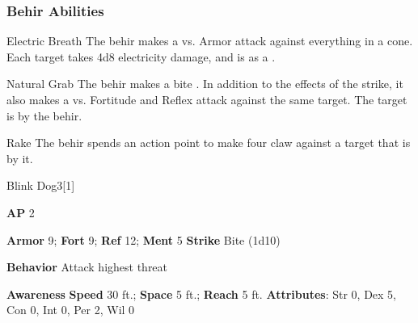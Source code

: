 \subsubsection{Behir Abilities}

\begin{ability}{Electric Breath}
The behir makes a  vs. Armor attack against everything in a \areamed cone.
\hit Each target takes 4d8 electricity damage, and is  as a .
\end{ability}

\vspace{0.5em}
\begin{ability}{Natural Grab}
The behir makes a bite .
In addition to the effects of the strike, it also makes a  vs. Fortitude and Reflex attack against the same target.
\hit The target is  by the behir.
\end{ability}

\vspace{0.5em}
\begin{ability}{Rake}
The behir spends an action point to make four claw  against a target that is  by it.
\end{ability}

\begin{monsection}{Blink Dog}{3}[1]
\vspace{-1em}\vspace{-1em}
\begin{spellcontent}
\begin{spelltargetinginfo}
{\textbf{AP} 2}

\pari \textbf{Armor} 9;
\textbf{Fort} 9;
\textbf{Ref} 12;
\textbf{Ment} 5
\pari \textbf{Strike} Bite  (1d10)



\pari \textbf{Behavior} Attack highest threat
\end{spelltargetinginfo}
\end{spellcontent}

\begin{monsterfooter}
\pari \textbf{Awareness} 
\pari \textbf{Speed} 30 ft.;
\textbf{Space} 5 ft.;
\textbf{Reach} 5 ft.
\pari \textbf{Attributes}:
Str 0,
Dex 5,
Con 0,
Int 0,
Per 2,
Wil 0
\end{monsterfooter}
\end{monsection}


